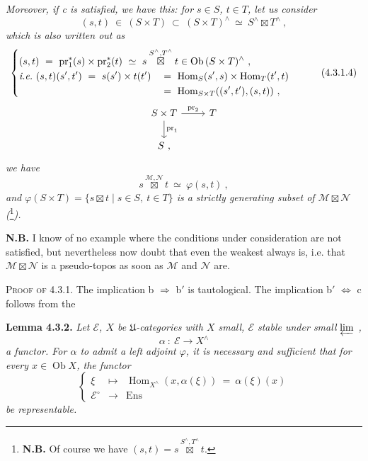 \documentclass[11pt]{article}
\newcommand{\printedpage}[1]{\marginpar{\footnotesize p.~#1}}
\newcommand{\msp}[1]{\marginpar{\footnotesize [#1]}}
\newcommand{\Hom}{\operatorname{Hom}}
\newcommand{\Ob}{\operatorname{Ob}}
\newcommand{\pr}{\operatorname{pr}}
\begin{document}
\setcounter{footnote}{6}

\printedpage{9}

\noindent\textit{Moreover, if c is satisfied, we have this: for $s\in S$, $t\in T$, let us consider}
\[
(s,t)\ \in\ (S\times T)\ \subset\ (S\times T)^\wedge\ \simeq\ S^\wedge\boxtimes T^\wedge\ ,
\]
\textit{which is also written out as}
\[
\left\{
\begin{aligned}
&\rlap{$\displaystyle (s,t)\ =\ \pr_1^*(s)\times\pr_2^*(t)\ \simeq\ s\overset{S^\wedge,T^\wedge}{\boxtimes}t\in\Ob\,(S\times T)^\wedge\ ,$}\\
&\textit{i.e.}\ (s,t)(s',t')\ =\ s(s')\times t(t') &&=\ \Hom_S(s',s)\times\Hom_T(t',t)\\
& &&=\ \Hom_{S\times T}((s',t'),(s,t))\ ,
\end{aligned}
\right.
\tag*{(4.3.1.4)}
\]
\[
\begin{tikzcd}
S\times T \arrow[r, "\mathrm{pr}_2"] \arrow[d, "\mathrm{pr}_1"] & T\\
S\ ,
\end{tikzcd}
\]
\msp{page 66}\textit{we have}
\[
s\overset{\mathcal M,\mathcal N}{\boxtimes}t\ \simeq\ \varphi(s,t)\ ,
\tag*{(4.3.1.4)}
\]
\textit{and $\varphi(S\times T)=\{s\boxtimes t\mid s\in S,\ t\in T\}$ is a strictly generating subset of $\mathcal M\boxtimes\mathcal N$ (}\footnote{\textbf{N.B.} Of course we have $(s,t)=s\overset{S^\wedge,T^\wedge}{\boxtimes}t$.}\textit{).}

\noindent\textbf{N.B.} I know of no example where the conditions under consideration are not satisfied, but nevertheless now doubt that even the weakest always is, i.e. that $\mathcal M\boxtimes\mathcal N$ is a pseudo-topos as soon as $\mathcal M$ and $\mathcal N$ are.

\noindent\textsc{Proof of} 4.3.1. The implication b $\Longrightarrow$ b$'$ is tautological. The implication b$'$ $\Longleftrightarrow$ c follows from the

\noindent\textbf{Lemma 4.3.2.} \textit{Let $\mathcal E$, $X$ be $\mathfrak U$-categories with $X$ small, $\mathcal E$ stable under small $\varprojlim$ ,}
\[
\alpha\ :\ \mathcal E\longrightarrow X^\wedge
\]
\textit{a functor. For $\alpha$ to admit a left adjoint $\varphi$, it is necessary and sufficient that for every $x\in\Ob X$, the functor}
\[
\left\{
\begin{array}{ccl}
\xi & \longmapsto & \Hom_{X^\wedge}(x,\alpha(\xi))\ =\ \alpha(\xi)(x)\\
\mathcal E^\circ & \longrightarrow & \mathrm{Ens}
\end{array}
\right.
\]
\textit{be representable.}
\end{document}
